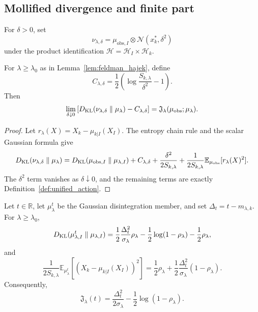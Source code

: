 \subsection{Mollified divergence and finite part}

For $\delta>0$, set
\[
  \nu_{\lambda,\delta}
  =
  \mu_{\mathrm{obs},I}\otimes\mathcal{N}(x_k^*,\delta^2)
\]
under the product identification
$\mathcal{H}=\mathcal{H}_I\times\mathcal{H}_k$.

\begin{proposition}
\label{prop:mollification_limit}
For $\lambda\ge\lambda_0$ as in Lemma~\ref{lem:feldman_hajek}, define
\[
  C_{\lambda,\delta}
  =
  \frac12\left(\log\frac{S_{k,\lambda}}{\delta^2}-1\right).
\]
Then
\[
  \lim_{\delta\downarrow0}
  \left[
    D_{\operatorname{KL}}(\nu_{\lambda,\delta}\parallel\mu_\lambda)
    -C_{\lambda,\delta}
  \right]
  =
  \mathfrak{J}_\lambda(\mu_{\mathrm{obs}};\mu_\lambda).
\]
\end{proposition}

\begin{proof}
Let $r_\lambda(X)=X_k-\mu_{k|I}(X_I)$.  The entropy chain rule and the scalar
Gaussian formula give
\[
  D_{\operatorname{KL}}(\nu_{\lambda,\delta}\parallel\mu_\lambda)
  =
  D_{\operatorname{KL}}(\mu_{\mathrm{obs},I}\parallel\mu_{\lambda,I})
  +C_{\lambda,\delta}
  +\frac{\delta^2}{2S_{k,\lambda}}
  +\frac{1}{2S_{k,\lambda}}
   \mathbb{E}_{\mu_{\mathrm{obs}}}[r_\lambda(X)^2].
\]
The $\delta^2$ term vanishes as $\delta\downarrow0$, and the remaining terms
are exactly Definition~\ref{def:unified_action}.
\end{proof}

\begin{lemma}
\label{lem:kl_finite_part_algebra}
Let $t\in\mathbb{R}$, let $\mu_\lambda^t$ be the Gaussian disintegration member,
and set $\Delta_t=t-m_{\lambda,k}$.  For $\lambda\ge\lambda_0$,
\begin{equation}
  D_{\operatorname{KL}}(\mu_{\lambda,I}^t\parallel\mu_{\lambda,I})
  =
  \frac12\frac{\Delta_t^2}{\sigma_\lambda}\rho_\lambda
  -\frac12\log(1-\rho_\lambda)-\frac12\rho_\lambda,
  \label{eq:bulk_KL_t_algebra}
\end{equation}
and
\begin{equation}
  \frac{1}{2S_{k,\lambda}}
  \mathbb{E}_{\mu_\lambda^t}
  \left[(X_k-\mu_{k|I}(X_I))^2\right]
  =
  \frac12\rho_\lambda
  +\frac12\frac{\Delta_t^2}{\sigma_\lambda}(1-\rho_\lambda).
  \label{eq:residual_t_algebra}
\end{equation}
Consequently,
\begin{equation}
  \mathfrak{J}_\lambda(t)
  =
  \frac{\Delta_t^2}{2\sigma_\lambda}
  -\frac12\log(1-\rho_\lambda).
  \label{eq:finite_part_exact_rank_one}
\end{equation}
\end{lemma}

